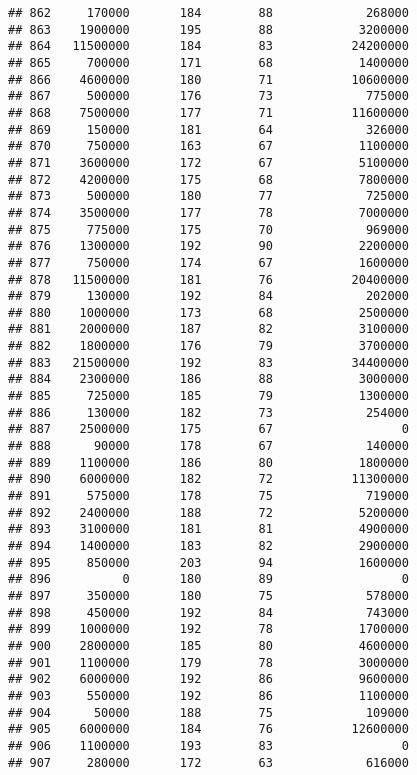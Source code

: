 \documentclass[
]{article}
\begin{document}
\begin{verbatim}
## 862     170000       184        88             268000
## 863    1900000       195        88            3200000
## 864   11500000       184        83           24200000
## 865     700000       171        68            1400000
## 866    4600000       180        71           10600000
## 867     500000       176        73             775000
## 868    7500000       177        71           11600000
## 869     150000       181        64             326000
## 870     750000       163        67            1100000
## 871    3600000       172        67            5100000
## 872    4200000       175        68            7800000
## 873     500000       180        77             725000
## 874    3500000       177        78            7000000
## 875     775000       175        70             969000
## 876    1300000       192        90            2200000
## 877     750000       174        67            1600000
## 878   11500000       181        76           20400000
## 879     130000       192        84             202000
## 880    1000000       173        68            2500000
## 881    2000000       187        82            3100000
## 882    1800000       176        79            3700000
## 883   21500000       192        83           34400000
## 884    2300000       186        88            3000000
## 885     725000       185        79            1300000
## 886     130000       182        73             254000
## 887    2500000       175        67                  0
## 888      90000       178        67             140000
## 889    1100000       186        80            1800000
## 890    6000000       182        72           11300000
## 891     575000       178        75             719000
## 892    2400000       188        72            5200000
## 893    3100000       181        81            4900000
## 894    1400000       183        82            2900000
## 895     850000       203        94            1600000
## 896          0       180        89                  0
## 897     350000       180        75             578000
## 898     450000       192        84             743000
## 899    1000000       192        78            1700000
## 900    2800000       185        80            4600000
## 901    1100000       179        78            3000000
## 902    6000000       192        86            9600000
## 903     550000       192        86            1100000
## 904      50000       188        75             109000
## 905    6000000       184        76           12600000
## 906    1100000       193        83                  0
## 907     280000       172        63             616000

\end{verbatim}
\end{document}
